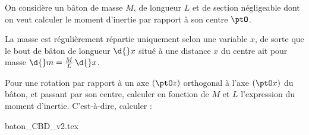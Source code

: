 \hauteurLargeurCadreReponse		{8mm}{7cm}
\typeEntrainement				{} %
\initialisationEntrainement



                                \initialisationPartieGauche %
On considère un bâton de masse $M$, de longueur $L$ et de section négligeable 
dont on veut calculer le moment d'inertie par rapport à son centre $\ptO$. 

La 
masse est régulièrement répartie uniquement selon une variable $x$, de sorte 
que le bout de bâton de longueur $\d{} x$ situé à une distance $x$ du 
centre ait pour masse $\d{}m = \frac{M}{L}\,\d{}x$. 

Pour une 
rotation par rapport à un axe $(\ptO z)$ orthogonal à l'axe $(\ptO x)$ du bâton, et passant par son centre, 
calculer en fonction de $M$ et $L$ l'expression du moment d'inertie. C'est-à-dire, calculer : 

                                \initialisationPartieDroite %
\begin{center}
{baton_CBD_v2.tex}
\end{center}
                               \finalisationDuPartageDePage %



